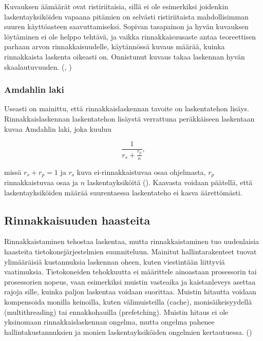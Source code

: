 Kuvauksen äämäärät ovat ristiriitaisia, sillä
ei ole esimerkiksi joidenkin laskentayksiköiden vapaana pitämien on selvästi
ristiriitaista mahdollisimman suuren käyttöasteen saavuttamiseksi. Sopivan
tasapainon ja hyvän kuvauksen löytäminen ei ole helppo tehtävä, ja vaikka
rinnakkaisuusaste antaa teoreettisen parhaan arvon rinnakkaisuudelle,
käytännössä kuvaus määrää, kuinka rinnakkaista laskenta oikeasti on.
Onnistunut kuvaus takaa laskennan hyvän skaalautuvuuden.
(\citealt{intro}, \citealt{rauber})

\subsubsection{Amdahlin laki}

Useasti on mainittu, että rinnakkaislaskennan tavoite on laskentatehon
lisäys. Rinnakkaislaskennan laskentatehon lisäystä verrattuna peräkkäiseen
laskentaan kuvaa Amdahlin laki, joka kuuluu

\begin{center}
\begin{equation}\frac{1}{r_s + \frac{r_p}{n}},\end{equation}
\end{center}

missä $r_s + r_p = 1$ ja $r_s$ kuva ei-rinnakkaistuvaa osaa ohjelmasta,
$r_p$ rinnakkaistuvaa osaa ja $n$ laskentayksiköitä (\citealt{amdahl}).
Kaavasta voidaan päätellä, että laskentayksiköiden määrää suurentaessa
laskentateho ei kasva äärettömästi.

\subsection{Rinnakkaisuuden haasteita}

Rinnakkaistaminen tehostaa laskentaa, mutta rinnakkaistaminen tuo
uudenlaisia haasteita tietokonejärjestelmien suunniteluun. Mainitut
hallintarakenteet tuovat ylimääräisiä kustannuksia laskennan oheen,
kuten viestintään liittyviä vaatimuksia.
Tietokoneiden tehokkuutta ei määrittele ainoastaan prosessorin tai
prosessorien nopeus, vaan esimerkiksi muistin vasteaika ja kaistanleveys
asettaa rajoja sille, kuinka paljon laskentaa voidaan suorittaa. Muistin
hitautta voidaan kompensoida monilla keinoilla, kuten välimuisteilla (cache),
monisäikeisyydellä (multithreading) tai ennakkohauilla (prefetching). Muistin
hitaus ei ole yksinomaan rinnakkaislaskennan ongelma, mutta ongelma pahenee
hallintakustannuksien ja monien laskentayksiköiden ongelmien kertautuessa.
(\citealt{intro})

